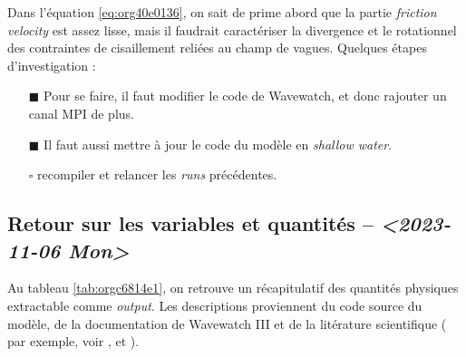 \documentclass[10pt]{report}
\numberwithin{equation}{section}
\renewcommand{\boxtimes}{\blacksquare}
\begin{document}
Dans l'équation \ref{eq:org40e0136}, on sait de prime abord que la partie \emph{friction velocity} est assez lisse, mais il faudrait caractériser la divergence et le rotationnel des contraintes de cisaillement reliées au champ de vagues.
Quelques étapes d'investigation : 
\begin{itemize}
\item[{$\boxtimes$}] Pour se faire, il faut modifier le code de Wavewatch, et donc rajouter un canal MPI de plus.
\item[{$\boxtimes$}] Il faut aussi mettre à jour le code du modèle en \emph{shallow water}.
\item[{$\square$}] recompiler et relancer les \emph{runs} précédentes.
\end{itemize}

\subsection{Retour sur les variables et quantités -- \textit{<2023-11-06 Mon>}}
\label{sec:orgd3f9b7f}

Au tableau \ref{tab:orgc6814e1}, on retrouve un récapitulatif des quantités physiques extractable comme \emph{output}.
Les descriptions proviennent du code source du modèle, de la documentation de Wavewatch III et de la litérature scientifique ( par exemple, voir \Textcite{ardhuin2010semiempirical}, \autocite{couvelard2020development} et \textcite{wu_breivik_2019}).
\end{document}

